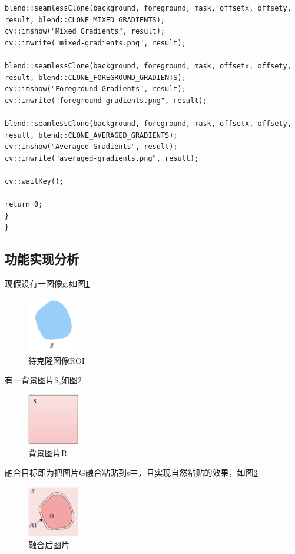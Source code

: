 \documentclass{article}
\begin{document}
\begin{lstlisting}
blend::seamlessClone(background, foreground, mask, offsetx, offsety, result, blend::CLONE_MIXED_GRADIENTS);
cv::imshow("Mixed Gradients", result);
cv::imwrite("mixed-gradients.png", result);

blend::seamlessClone(background, foreground, mask, offsetx, offsety, result, blend::CLONE_FOREGROUND_GRADIENTS);
cv::imshow("Foreground Gradients", result);
cv::imwrite("foreground-gradients.png", result);

blend::seamlessClone(background, foreground, mask, offsetx, offsety, result, blend::CLONE_AVERAGED_GRADIENTS);
cv::imshow("Averaged Gradients", result);
cv::imwrite("averaged-gradients.png", result);

cv::waitKey();

return 0;
}
}
\end{lstlisting}

    \subsection{功能实现分析}
    现假设有一图像g,如图\ref{fig.2}
      \begin{figure}[H]
    	\centering
    	\includegraphics[width=0.2\textwidth]{img/ROI.png}
    	\caption{待克隆图像ROI}
    	\label{fig.2}
    \end{figure}
有一背景图片S,如图\ref{fig.3}
\begin{figure}[H]
	\centering
	\includegraphics[width=0.2\textwidth]{img/R.png}
	\caption{背景图片R}
	\label{fig.3}
\end{figure}    
融合目标即为把图片G融合粘贴到s中，且实现自然粘贴的效果，如图\ref{fig.4}
\begin{figure}[H]
	\centering
	\includegraphics[width=0.2\textwidth]{img/Clone.png}
	\caption{融合后图片}
	\label{fig.4}
\end{figure}    
\end{document}

